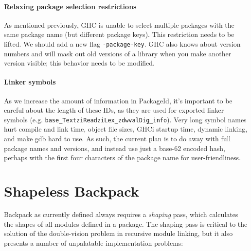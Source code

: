 \documentclass{article}
\begin{document}
\paragraph{Relaxing package selection restrictions}  As mentioned
previously, GHC is unable to select multiple packages with the same
package name (but different package keys).  This restriction needs to be
lifted.  We should add a new flag \verb|-package-key|.  GHC also knows
about version numbers and will mask out old versions of a library when
you make another version visible; this behavior needs to be modified.

\paragraph{Linker symbols} As we increase the amount of information in
PackageId, it's important to be careful about the length of these IDs,
as they are used for exported linker symbols (e.g.
\verb|base_TextziReadziLex_zdwvalDig_info|).  Very long symbol names
hurt compile and link time, object file sizes, GHCi startup time,
dynamic linking, and make gdb hard to use.  As such, the current plan is
to do away with full package names and versions, and instead use just a
base-62 encoded hash, perhaps with the first four characters of the package
name for user-friendliness.

\section{Shapeless Backpack}\label{sec:simplifying-backpack}

Backpack as currently defined always requires a \emph{shaping} pass,
which calculates the shapes of all modules defined in a package.
The shaping pass is critical to the solution of the double-vision problem
in recursive module linking, but it also presents a number of unpalatable
implementation problems:
\end{document}
